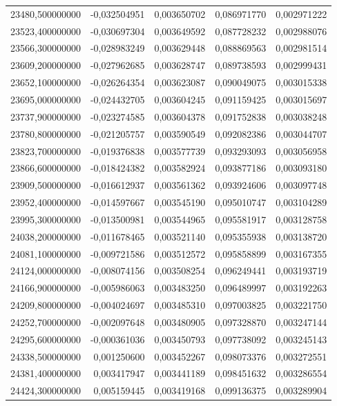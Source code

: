 \begin{longtable}{rrrrr}
23480,500000000 & -0,032504951 & 0,003650702 & 0,086971770 & 0,002971222\\
23523,400000000 & -0,030697304 & 0,003649592 & 0,087728232 & 0,002988076\\
23566,300000000 & -0,028983249 & 0,003629448 & 0,088869563 & 0,002981514\\
23609,200000000 & -0,027962685 & 0,003628747 & 0,089738593 & 0,002999431\\
23652,100000000 & -0,026264354 & 0,003623087 & 0,090049075 & 0,003015338\\
23695,000000000 & -0,024432705 & 0,003604245 & 0,091159425 & 0,003015697\\
23737,900000000 & -0,023274585 & 0,003604378 & 0,091752838 & 0,003038248\\
23780,800000000 & -0,021205757 & 0,003590549 & 0,092082386 & 0,003044707\\
23823,700000000 & -0,019376838 & 0,003577739 & 0,093293093 & 0,003056958\\
23866,600000000 & -0,018424382 & 0,003582924 & 0,093877186 & 0,003093180\\
23909,500000000 & -0,016612937 & 0,003561362 & 0,093924606 & 0,003097748\\
23952,400000000 & -0,014597667 & 0,003545190 & 0,095010747 & 0,003104289\\
23995,300000000 & -0,013500981 & 0,003544965 & 0,095581917 & 0,003128758\\
24038,200000000 & -0,011678465 & 0,003521140 & 0,095355938 & 0,003138720\\
24081,100000000 & -0,009721586 & 0,003512572 & 0,095858899 & 0,003167355\\
24124,000000000 & -0,008074156 & 0,003508254 & 0,096249441 & 0,003193719\\
24166,900000000 & -0,005986063 & 0,003483250 & 0,096489997 & 0,003192263\\
24209,800000000 & -0,004024697 & 0,003485310 & 0,097003825 & 0,003221750\\
24252,700000000 & -0,002097648 & 0,003480905 & 0,097328870 & 0,003247144\\
24295,600000000 & -0,000361036 & 0,003450793 & 0,097738092 & 0,003245143\\
24338,500000000 & 0,001250600 & 0,003452267 & 0,098073376 & 0,003272551\\
24381,400000000 & 0,003417947 & 0,003441189 & 0,098451632 & 0,003286554\\
24424,300000000 & 0,005159445 & 0,003419168 & 0,099136375 & 0,003289904\\

\end{longtable}
